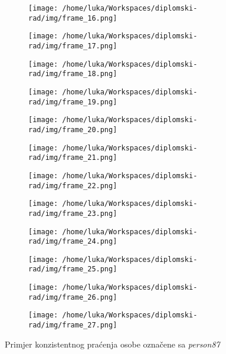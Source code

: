 \begin{figure}[htp]
	\centering
	\begin{subfigure}[b]{0.4\linewidth}
		\texttt{[image: /home/luka/Workspaces/diplomski-rad/img/frame\_16.png]}
	\end{subfigure}
	\begin{subfigure}[b]{0.4\linewidth}
		\texttt{[image: /home/luka/Workspaces/diplomski-rad/img/frame\_17.png]}
	\end{subfigure}
	\begin{subfigure}[b]{0.4\linewidth}
		\texttt{[image: /home/luka/Workspaces/diplomski-rad/img/frame\_18.png]}
	\end{subfigure}
	\begin{subfigure}[b]{0.4\linewidth}
		\texttt{[image: /home/luka/Workspaces/diplomski-rad/img/frame\_19.png]}
	\end{subfigure}
	\begin{subfigure}[b]{0.4\linewidth}
		\texttt{[image: /home/luka/Workspaces/diplomski-rad/img/frame\_20.png]}
	\end{subfigure}
	\begin{subfigure}[b]{0.4\linewidth}
		\texttt{[image: /home/luka/Workspaces/diplomski-rad/img/frame\_21.png]}
	\end{subfigure}
	\begin{subfigure}[b]{0.4\linewidth}
		\texttt{[image: /home/luka/Workspaces/diplomski-rad/img/frame\_22.png]}
	\end{subfigure}
	\begin{subfigure}[b]{0.4\linewidth}
		\texttt{[image: /home/luka/Workspaces/diplomski-rad/img/frame\_23.png]}
	\end{subfigure}
	\begin{subfigure}[b]{0.4\linewidth}
		\texttt{[image: /home/luka/Workspaces/diplomski-rad/img/frame\_24.png]}
	\end{subfigure}
	\begin{subfigure}[b]{0.4\linewidth}
		\texttt{[image: /home/luka/Workspaces/diplomski-rad/img/frame\_25.png]}
	\end{subfigure}
	\begin{subfigure}[b]{0.4\linewidth}
		\texttt{[image: /home/luka/Workspaces/diplomski-rad/img/frame\_26.png]}
	\end{subfigure}
	\begin{subfigure}[b]{0.4\linewidth}
		\texttt{[image: /home/luka/Workspaces/diplomski-rad/img/frame\_27.png]}
	\end{subfigure}
	\caption{Primjer konzistentnog praćenja osobe označene sa \textit{person87}}
	\label{img:tracking}
\end{figure}

